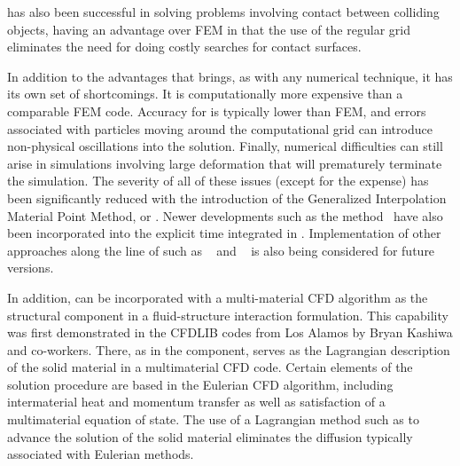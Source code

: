 \MPM has also been successful
in solving problems involving contact between colliding objects, having an
advantage over FEM in that the use of the regular grid eliminates the
need for doing costly searches for contact surfaces\cite{Bard2000}.

In addition to the advantages that \MPM brings, as with any numerical technique, it has
its own set of shortcomings.  It is computationally more
expensive than a comparable FEM code.  Accuracy for \MPM is typically lower
than FEM, and errors associated with particles moving around the computational
grid can introduce non-physical oscillations into the solution.  Finally,
numerical difficulties can still arise in simulations involving large
deformation that will prematurely terminate the simulation.  The severity of
all of these issues (except for the expense) has been significantly reduced
with the introduction of the Generalized Interpolation Material Point Method,
or \GIMP\cite{Bard2004}. Newer developments such as the \CPDI \MPM
method~\cite{Sadeghirad2011} have also been incorporated into the explicit
time integrated \MPM in \Vaango.  Implementation of other approaches along the
line of \CPDI such as ~\cite{Sadeghirad2013} and ~\cite{Leavy2019} is
also being considered for future versions.

In addition, \MPM can be incorporated with a multi-material CFD algorithm
as the structural component in a fluid-structure interaction formulation.
This capability was first demonstrated in the CFDLIB codes from
Los Alamos by Bryan Kashiwa and co-workers\cite{Kashiwa2000}.  There, as
in the \MPMICE component, \MPM serves as the Lagrangian description of the solid
material in a multimaterial CFD code.  Certain elements of the
solution procedure are based in the Eulerian CFD algorithm, including
intermaterial heat and momentum transfer as well as satisfaction
of a multimaterial equation of state.  The use of a Lagrangian method
such as \MPM to advance the solution of the solid material eliminates
the diffusion typically associated with Eulerian methods.  

